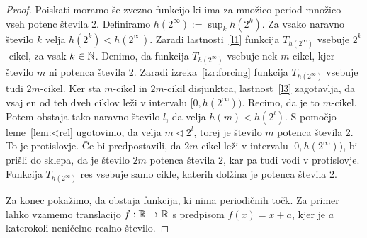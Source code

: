 \documentclass[../TG_magistrsko_delo_sections.tex]{subfiles}
\begin{document}
\begin{proof}
Poiskati moramo še zvezno funkcijo ki ima za množico period množico vseh potenc števila 2. Definiramo $h(2^{\infty}) := \sup_k h(2^k)$. Za vsako naravno število $k$ velja $h(2^k) < h(2^{\infty})$. Zaradi lastnosti~\ref{l1} funkcija $T_{h(2^{\infty})}$ vsebuje $2^k$-cikel, za vsak $k \in \mathbb N$. 
Denimo, da funkcija $T_{h(2^{\infty})}$ vsebuje nek $m$ cikel, kjer število $m$ ni potenca števila 2. Zaradi izreka~\ref{izr:forcing} funkcija $T_{h(2^{\infty})}$ vsebuje tudi $2m$-cikel. Ker sta $m$-cikel in $2m$-cikil disjunktca, lastnost~\ref{l3} zagotavlja, da vsaj en od teh dveh ciklov leži v intervalu $[0, h(2^{\infty}))$. Recimo, da je to $m$-cikel. Potem obstaja tako naravno število $l$, da velja $h(m) < h(2^l)$. S pomočjo leme~\ref{lem:<rel} ugotovimo, da velja $m \triangleleft 2^l$, torej je število $m$ potenca števila 2. To je protislovje. Če bi predpostavili, da $2m$-cikel leži v intervalu $[0, h(2^{\infty}))$, bi prišli do sklepa, da je število $2m$ potenca števila 2, kar pa tudi vodi v protislovje. Funkcija $T_{h(2^{\infty})}$ res vsebuje samo cikle, katerih dolžina je potenca števila 2.

Za konec pokažimo, da obstaja funkcija, ki nima periodičnih točk. Za primer lahko vzamemo translacijo $f : \mathbb R \to \mathbb R$ s predpisom $f(x) = x + a$, kjer je $a$ katerokoli neničelno realno število.
\end{proof}
\end{document}
